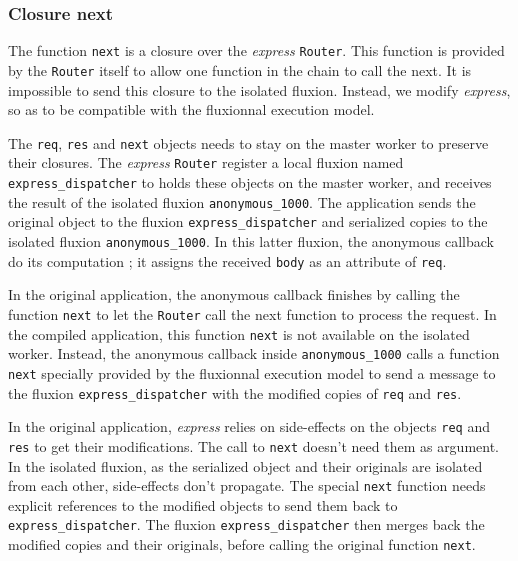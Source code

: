 \subsubsection{Closure next}

The function \texttt{next} is a closure over the \textit{express} \texttt{Router}.
This function is provided by the \texttt{Router} itself to allow one function in the chain to call the next.
It is impossible to send this closure to the isolated fluxion.
Instead, we modify \textit{express}, so as to be compatible with the fluxionnal execution model.

The \texttt{req}, \texttt{res} and \texttt{next} objects needs to stay on the master worker to preserve their closures.
The \textit{express} \texttt{Router} register a local fluxion named \texttt{express\_dispatcher} to holds these objects on the master worker, and receives the result of the isolated fluxion \texttt{anonymous\_1000}.
The application sends the original object to the fluxion \texttt{express\_dispatcher} and serialized copies to the isolated fluxion \texttt{anonymous\_1000}.
In this latter fluxion, the anonymous callback do its computation ; it assigns the received \texttt{body} as an attribute of \texttt{req}.

In the original application, the anonymous callback finishes by calling the function \texttt{next} to let the \texttt{Router} call the next function to process the request.
In the compiled application, this function \texttt{next} is not available on the isolated worker.
Instead, the anonymous callback inside \texttt{anonymous\-\_1000} calls a function \texttt{next} specially provided by the fluxionnal execution model to send a message to the fluxion \texttt{express\-\_dispatcher} with the modified copies of \texttt{req} and \texttt{res}.

In the original application, \textit{express} relies on side-effects on the objects \texttt{req} and \texttt{res} to get their modifications.
The call to \texttt{next} doesn't need them as argument.
In the isolated fluxion, as the serialized object and their originals are isolated from each other, side-effects don't propagate.
The special \texttt{next} function needs explicit references to the modified objects to send them back to \texttt{express\_dispatcher}.
The fluxion \texttt{express\_dispatcher} then merges back the modified copies and their originals, before calling the original function \texttt{next}.

